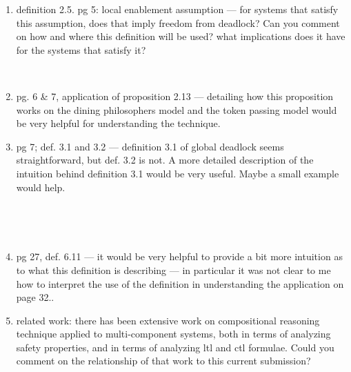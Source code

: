 \begin{enumerate}
\item  definition 2.5. pg 5:  local enablement assumption --- for systems that satisfy
this assumption, does that imply freedom from deadlock?   Can you comment on how and where
this definition will be used?  what implications does it have for the systems that satisfy it?

~


\item  pg. 6 \& 7, application of proposition 2.13 --- detailing how this proposition works
on the dining philosophers model and the token passing model would be very helpful
for understanding the technique.


\item pg 7; def. 3.1 and 3.2 --- definition 3.1 of global deadlock seems straightforward, but
def. 3.2 is not.  A more detailed description of the intuition behind definition 3.1 would
be very useful.  Maybe a small example would help.

~


~

\item pg 27, def. 6.11 --- it would be very helpful to provide a bit more
intuition as to what this definition is describing --- in particular it was not
clear to me how to interpret the use of the definition in understanding the
application on page 32..


\item  related work: there has been extensive work on compositional reasoning
technique applied to multi-component systems, both in terms of analyzing
safety properties, and in terms of analyzing ltl and ctl formulae.  Could you comment
on the relationship of that work to this current submission?

\end{enumerate}






